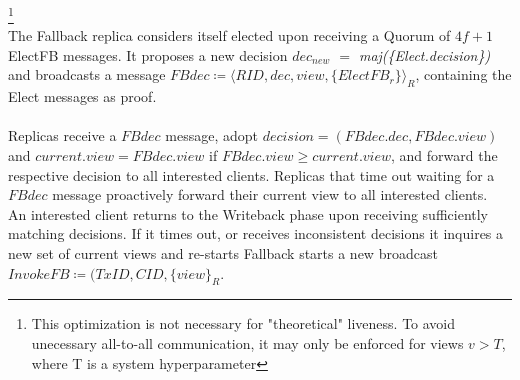 \footnote{This optimization is not necessary for "theoretical" liveness. To avoid unecessary all-to-all communication, it may only be enforced for views $v > T$, where T is a system hyperparameter }\\
The Fallback replica considers itself elected upon receiving a Quorum of $4f+1$ ElectFB messages. It proposes a new decision \textit{$dec_{new}$ $=$ maj(\{Elect.decision\})} and broadcasts a message $FBdec \coloneqq \langle RID, dec, view, \{ElectFB_r\} \rangle_R$, containing the Elect messages as proof. \\
\\
Replicas receive a $FBdec$ message, adopt $decision = (FBdec.dec, FBdec.view)$ and $current.view = FBdec.view$ if $FBdec.view \geq current.view$, and forward the respective decision to all interested clients. Replicas that time out waiting for a $FBdec$ message proactively forward their current view to all interested clients. \\
An interested client returns to the Writeback phase upon receiving sufficiently matching decisions. If it times out, or receives inconsistent decisions it inquires a new set of current views and re-starts Fallback starts a new broadcast $InvokeFB \coloneqq (TxID, CID, \{view\}_R$.\\
